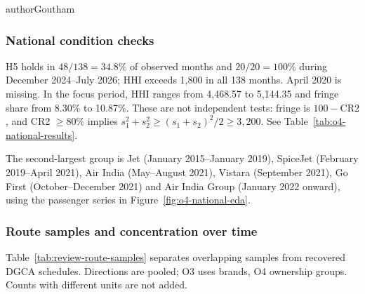 \begin{mergedcontribution}{authorGoutham}
\subsubsection{National condition checks}
\label{app:o4-national-summary}
H5 holds in $48/138=34.8\%$ of observed months and $20/20=100\%$ during December 2024--July 2026; HHI exceeds 1,800 in all 138 months. April 2020 is missing. In the focus period, HHI ranges from 4,468.57 to 5,144.35 and fringe share from 8.30\% to 10.87\%. These are not independent tests: fringe is $100-\mathrm{CR2}$, and CR2 $\geq80\%$ implies $s_1^2+s_2^2\geq(s_1+s_2)^2/2\geq3{,}200$. See Table~\ref{tab:o4-national-results}.

The second-largest group is Jet (January 2015--January 2019), SpiceJet (February 2019--April 2021), Air India (May--August 2021), Vistara (September 2021), Go First (October--December 2021) and Air India Group (January 2022 onward), using the passenger series in Figure~\ref{fig:o4-national-eda}.

\subsubsection{Route samples and concentration over time}
\label{app:eda-route-support}
Table~\ref{tab:review-route-samples} separates overlapping samples from recovered DGCA schedules. Directions are pooled; O3 uses brands, O4 ownership groups. Counts with different units are not added.


\end{mergedcontribution}
